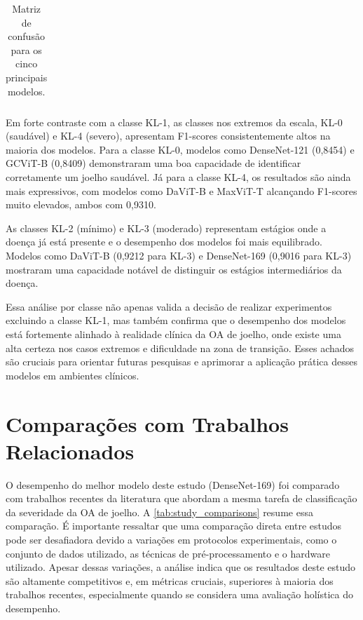 \begin{table}[!htbp]
\begin{tabular}{|l|c|c|}
    \end{tabular}
    \caption{Matriz de confusão para os cinco principais modelos.}
    \label{tab:matrizes_confusao}
\end{table}

Em forte contraste com a classe KL-1, as classes nos extremos da escala, KL-0 (saudável) e KL-4 (severo), apresentam F1-scores consistentemente altos na maioria dos modelos. Para a classe KL-0, modelos como DenseNet-121 (0,8454) e GCViT-B (0,8409) demonstraram uma boa capacidade de identificar corretamente um joelho saudável. Já para a classe KL-4, os resultados são ainda mais expressivos, com modelos como DaViT-B e MaxViT-T alcançando F1-scores muito elevados, ambos com 0,9310.

As classes KL-2 (mínimo) e KL-3 (moderado) representam estágios onde a doença já está presente e o desempenho dos modelos foi mais equilibrado. Modelos como DaViT-B (0,9212 para KL-3) e DenseNet-169 (0,9016 para KL-3) mostraram uma capacidade notável de distinguir os estágios intermediários da doença.

Essa análise por classe não apenas valida a decisão de realizar experimentos excluindo a classe KL-1, mas também confirma que o desempenho dos modelos está fortemente alinhado à realidade clínica da OA de joelho, onde existe uma alta certeza nos casos extremos e dificuldade na zona de transição. Esses achados são cruciais para orientar futuras pesquisas e aprimorar a aplicação prática desses modelos em ambientes clínicos.

\section{Comparações com Trabalhos Relacionados}

O desempenho do melhor modelo deste estudo (DenseNet-169) foi comparado com trabalhos recentes da literatura que abordam a mesma tarefa de classificação da severidade da OA de joelho. A \autoref{tab:study_comparisons} resume essa comparação. É importante ressaltar que uma comparação direta entre estudos pode ser desafiadora devido a variações em protocolos experimentais, como o conjunto de dados utilizado, as técnicas de pré-processamento e o hardware utilizado. Apesar dessas variações, a análise indica que os resultados deste estudo são altamente competitivos e, em métricas cruciais, superiores à maioria dos trabalhos recentes, especialmente quando se considera uma avaliação holística do desempenho.

